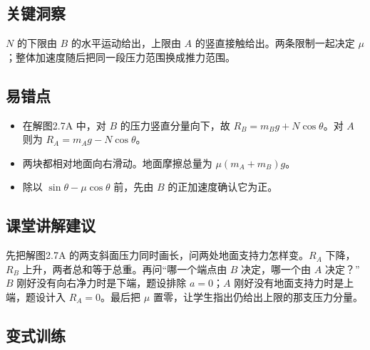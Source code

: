 \documentclass[UTF8,fontset=fandol,a4paper,11pt]{ctexart}
\begin{document}
\subsection*{关键洞察}

$N$ 的下限由 $B$ 的水平运动给出，上限由 $A$ 的竖直接触给出。两条限制一起决定 $\mu$；整体加速度随后把同一段压力范围换成推力范围。



\subsection*{易错点}

\begin{itemize}
\item 在解图2.7A 中，对 $B$ 的压力竖直分量向下，故 $R_B=m_Bg+N\cos\theta$。对 $A$ 则为 $R_A=m_Ag-N\cos\theta$。
\item 两块都相对地面向右滑动。地面摩擦总量为 $\mu(m_A+m_B)g$。
\item 除以 $\sin\theta-\mu\cos\theta$ 前，先由 $B$ 的正加速度确认它为正。
\end{itemize}



\subsection*{课堂讲解建议}

先把解图2.7A 的两支斜面压力同时画长，问两处地面支持力怎样变。$R_A$ 下降，$R_B$ 上升，两者总和等于总重。再问“哪一个端点由 $B$ 决定，哪一个由 $A$ 决定？”$B$ 刚好没有向右净力时是下端，题设排除 $a=0$；$A$ 刚好没有地面支持力时是上端，题设计入 $R_A=0$。最后把 $\mu$ 置零，让学生指出仍给出上限的那支压力分量。



\subsection*{变式训练}
\end{document}
